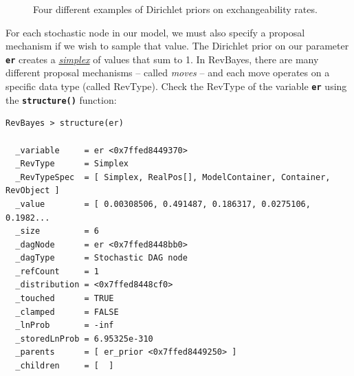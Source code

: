 \documentclass[11pt]{article}
\newcommand{\cl}[1]{{\texttt{\textbf{#1}}}}
\begin{document}
\begin{figure}[h!]
\centering
{}
\caption{\small Four different examples of Dirichlet priors on exchangeability rates.}
\label{dirichletFig}
\end{figure}

For each stochastic node in our model, we must also specify a proposal mechanism if we wish to sample that value. 
The Dirichlet prior on our parameter \cl{er} creates a \href{http://en.wikipedia.org/wiki/Simplex}{\textit{simplex}} of values that sum to 1. 
In RevBayes, there are many different proposal mechanisms -- called \textit{moves} -- and each move operates on a specific data type (called RevType). 
Check the RevType of the variable \cl{er} using the \cl{structure()} function:
{\tt \small \begin{snugshade*}
\begin{lstlisting}
RevBayes > structure(er)

  _variable     = er <0x7ffed8449370>
  _RevType      = Simplex
  _RevTypeSpec  = [ Simplex, RealPos[], ModelContainer, Container, RevObject ]
  _value        = [ 0.00308506, 0.491487, 0.186317, 0.0275106, 0.1982...
  _size         = 6
  _dagNode      = er <0x7ffed8448bb0>
  _dagType      = Stochastic DAG node
  _refCount     = 1
  _distribution = <0x7ffed8448cf0>
  _touched      = TRUE
  _clamped      = FALSE
  _lnProb       = -inf
  _storedLnProb = 6.95325e-310
  _parents      = [ er_prior <0x7ffed8449250> ]
  _children     = [  ]
\end{lstlisting}
\end{snugshade*}}
\end{document}

